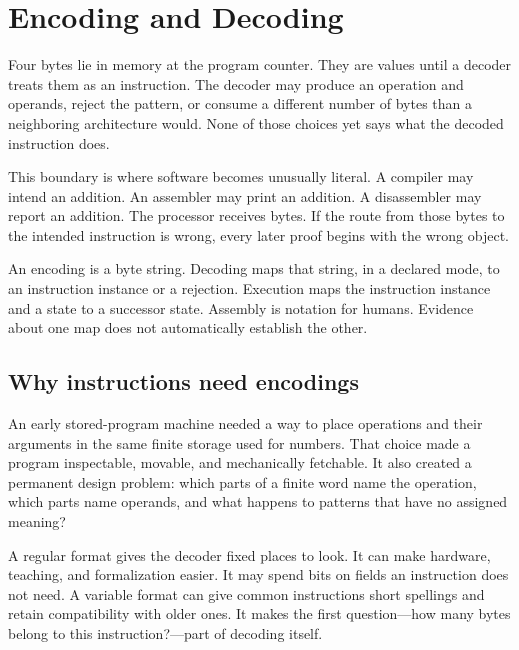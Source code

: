 \chapter{Encoding and Decoding}
\label{ch:encoding-decoding}

Four bytes lie in memory at the program counter. They are values until a
decoder treats them as an instruction. The decoder may produce an operation
and operands, reject the pattern, or consume a different number of bytes than
a neighboring architecture would. None of those choices yet says what the
decoded instruction does.

This boundary is where software becomes unusually literal. A compiler may
intend an addition. An assembler may print an addition. A disassembler may
report an addition. The processor receives bytes. If the route from those
bytes to the intended instruction is wrong, every later proof begins with the
wrong object.

\begin{keyidea}[title={Bytes, instructions, and effects are different objects}]
An encoding is a byte string. Decoding maps that string, in a declared mode,
to an instruction instance or a rejection. Execution maps the instruction
instance and a state to a successor state. Assembly is notation for humans.
Evidence about one map does not automatically establish the other.
\end{keyidea}

\section{Why instructions need encodings}

An early stored-program machine needed a way to place operations and their
arguments in the same finite storage used for numbers. That choice made a
program inspectable, movable, and mechanically fetchable. It also created a
permanent design problem: which parts of a finite word name the operation,
which parts name operands, and what happens to patterns that have no assigned
meaning?

A regular format gives the decoder fixed places to look. It can make hardware,
teaching, and formalization easier. It may spend bits on fields an instruction
does not need. A variable format can give common instructions short spellings
and retain compatibility with older ones. It makes the first question---how
many bytes belong to this instruction?---part of decoding itself.


